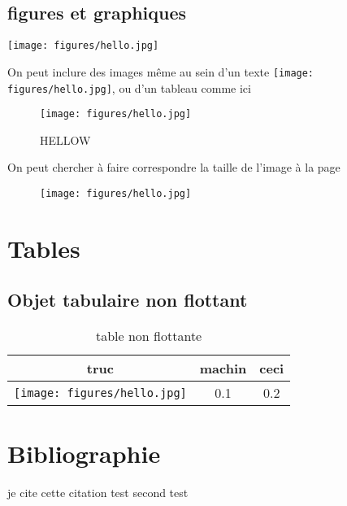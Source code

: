 \documentclass[a4paper, 10pt]{article}
\begin{document}
\begin{multicols}{2}
\section{figures et graphiques}

\texttt{[image: figures/hello.jpg]}

On peut inclure des images même au sein d'un texte \texttt{[image: figures/hello.jpg]}, ou d'un tableau  comme ici


\begin{figure}
\begin{center}
\texttt{[image: figures/hello.jpg]}
\caption{HELLOW} %
\end{center}
\end{figure}
On peut chercher à faire correspondre la taille de l'image à la page

\begin{figure*}
\begin{center}
\texttt{[image: figures/hello.jpg]}
\end{center}
\end{figure*}

\blindtext[10]


\end{multicols}
\newpage

\section{Tables}
\subsection{Objet tabulaire non flottant}
\begin{table}
\begin{tabular}{|c|c|c|}
\hline
truc& machin & ceci\\
\hline
\texttt{[image: figures/hello.jpg]} & 0.1 & 0.2 \\
\hline
\end{tabular}
\caption{table non flottante}
\end{table}















\section{Bibliographie}
je cite cette citation \cite{PMID12643357} %
test \citep{PMID12643357} %
second test  \citet{PMID12643357}



\end{document}
